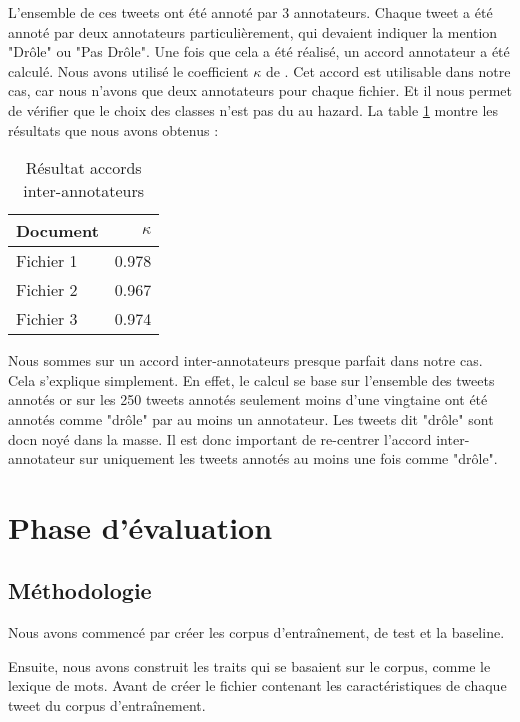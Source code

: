 \documentclass[10pt,a4paper,twoside]{article}
\begin{document}
L'ensemble de ces tweets ont été annoté par 3 annotateurs. Chaque tweet a été annoté par deux annotateurs particulièrement, qui devaient indiquer la mention "Drôle" ou "Pas Drôle". Une fois que cela a été réalisé, un accord annotateur a été calculé. Nous avons utilisé le coefficient $\kappa$ de \cite{cohen1960}. Cet accord est utilisable dans notre cas, car nous n'avons que deux annotateurs pour chaque fichier. Et il nous permet de vérifier que le choix des classes n'est pas du au hazard. La table \ref{anno} montre les résultats que nous avons obtenus :

\begin{table}[!h]
\centering
	\begin{tabular}{lr}
	\toprule
	 Document & $\kappa$ \\
	\midrule
	  Fichier 1 & 0.978 \\
	  Fichier 2 &  0.967\\
	  Fichier 3 & 0.974  \\
	\bottomrule
	\end{tabular}
\caption{Résultat accords inter-annotateurs}
\label{anno}
\end{table}

Nous sommes sur un accord inter-annotateurs presque parfait dans notre cas. Cela s'explique simplement. En effet, le calcul se base sur l'ensemble des tweets annotés or sur les 250 tweets annotés seulement moins d'une vingtaine ont été annotés comme "drôle" par au moins un annotateur. Les tweets dit "drôle" sont docn noyé dans la masse. Il est donc important de re-centrer l'accord inter-annotateur sur uniquement les tweets annotés au moins une fois comme "drôle". 


\section{Phase d'évaluation}
\label{eval}
\subsection{Méthodologie}
Nous avons commencé par créer les corpus d'entraînement, de test et la baseline.

Ensuite, nous avons construit les traits qui se basaient sur le corpus, comme le lexique de mots. Avant de créer le fichier contenant les caractéristiques de chaque tweet du corpus d'entraînement.
\end{document}
